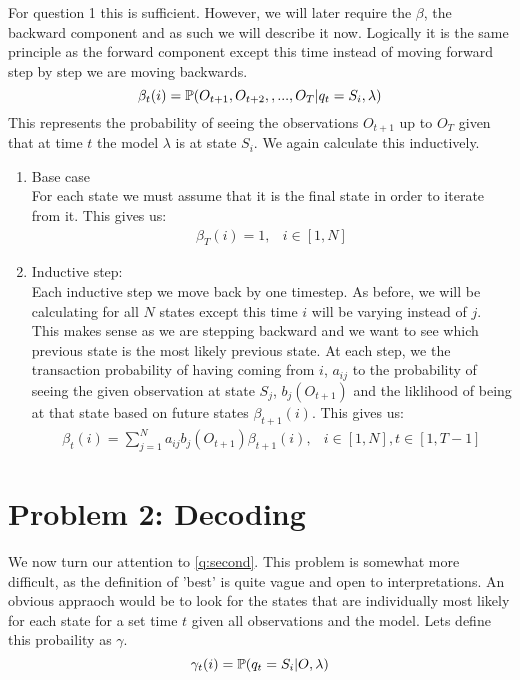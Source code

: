 For question 1 this is sufficient. However, we will later require the $\beta$, the backward component and as such we will describe it now. Logically it is the same principle as the forward component except this time instead of moving forward step by step we are moving backwards.
\begin{equation}
    \label{beta}
    \beta_t(i) = \mathbb{P} (O_{t+1},O_{t+2},,...,O_T | q_t=S_i, \lambda)
\end{equation}
This represents the probability of seeing the observations $O_{t+1}$ up to $O_T$ given that at time $t$ the model $\lambda$ is at state $S_i$. We again calculate this inductively.

\begin{enumerate}
    \item Base case \\
    For each state we must assume that it is the final state in order to iterate from it. This gives us:
    \begin{eqnarray}
        \beta_T(i) = 1, & i \in [1,N]
    \end{eqnarray}

    \item Inductive step: \\
    Each inductive step we move back by one timestep. As before, we will be calculating for all $N$ states except this time $i$ will be varying instead of $j$. This makes sense as we are stepping backward and we want to see which previous state is the most likely previous state. At each step, we the transaction probability of having coming from $i$, $a_{ij}$ to the probability of seeing the given observation at state $S_j$, $b_j(O_{t+1})$ and the liklihood of being at that state based on future states $\beta_{t+1}(i)$. This gives us:
    \begin{eqnarray}
        \beta_{t}(i) = \sum_{j=1}^N a_{ij} b_j(O_{t+1}) \beta_{t+1}(i), & i \in [1,N], t \in [1,T-1]
    \end{eqnarray}
\end{enumerate}



\section{Problem 2: Decoding}
We now turn our attention to \ref{q:second}. This problem is somewhat more difficult, as the definition of 'best' is quite vague and open to interpretations. An obvious appraoch would be to look for the states that are individually most likely for each state for a set time $t$ given all observations and the model. Lets define this probaility as $\gamma$.
\begin{equation}
    \gamma_t(i) = \mathbb{P} (q_t = S_i | O, \lambda)
\end{equation}

